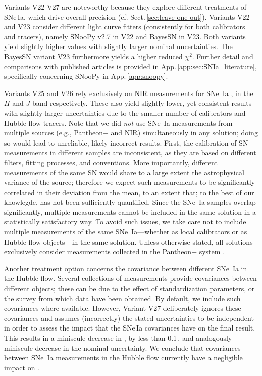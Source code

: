 Variants V22-V27 are noteworthy because they explore different treatments of SNe\,Ia, which drive overall precision (cf. Sect.\,\ref{sec:leave-one-out}). 
Variants V22 and V23 consider different light curve fitters (consistently for both calibrators and tracers), namely SNooPy v2.7 in V22 and BayesSN in V23. Both variants yield slightly higher \Hcst{} values with slightly larger nominal uncertainties. The BayesSN variant V23 furthermore yields a higher reduced $ \chi^2 $. Further detail and comparisons with published articles is provided in App.\,\ref{app:sec:SNIa_literature}, specifically concerning SNooPy in App.\,\ref{app:snoopy}.

Variants V25 and V26 rely exclusively on NIR measurements for SNe~Ia \citep{2023AA...679A..95G}, in the $ H $ and $ J $ band respectively. These also yield slightly lower, yet consistent \Hcst{} results with slightly larger uncertainties due to the smaller number of calibrators and Hubble flow tracers.  Note that we did \textit{not} use SNe~Ia measurements from multiple sources (e.g., Pantheon+ and NIR) simultaneously in any solution; doing so would lead to unreliable, likely incorrect results.  First, the calibration of SN measurements in different samples are inconsistent, as they are based on different filters, fitting processes, and conventions.  More importantly, different measurements of the same SN would share to a large extent the astrophysical variance of the source; therefore we expect such measurements to be significantly correlated in their deviation from the mean, to an extent that; to the best of our knowlegde, has not been sufficiently quantified.  Since the SNe~Ia samples overlap significantly, multiple measurements cannot be included in the same solution in a statistically satisfactory way.  To avoid such issues, we take care not to include multiple measurements of the same SNe~Ia---whether as local calibrators or as Hubble flow objects---in the same solution. Unless otherwise stated, all solutions exclusively consider measurements collected in the Pantheon+ system \citep{2022ApJ...938..113S}.

Another treatment option concerns the covariance between different SNe~Ia in the Hubble flow. Several collections of measurements provide covariances between different objects; these can be due to the effect of standardization parameters, or the survey from which data have been obtained. By default, we include such covariances where available. However, Variant V27 deliberately ignores these covariances and assumes (incorrectly) the stated uncertainties to be independent in order to assess the impact that the SNe\,Ia covariances have on the final result. This results in a miniscule decrease in {\Hcst}, by less than 0.1\,{\Hunit}, and analogously miniscule decrease in the nominal uncertainty. We conclude that covariances between SNe~Ia measurements in the Hubble flow currently have a negligible impact on \Hcst. 

